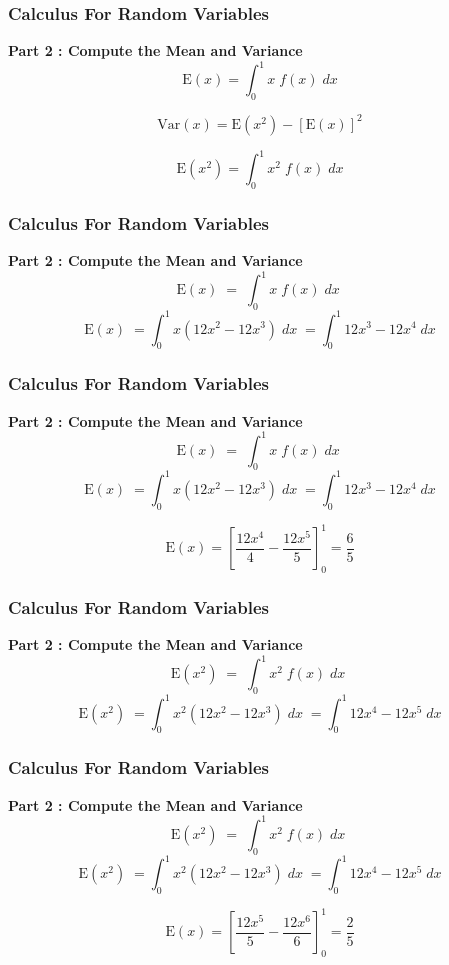 \documentclass[a4]{beamer}
\begin{document}
\begin{frame}
\frametitle{Calculus For Random Variables}
\Large
\vspace{-0.5cm}
\textbf{Part 2 :  Compute the Mean and Variance}\\
\[ \mathrm{E}(x) = \int^1_0 x\; f(x)\;dx  \]

\[ \mathrm{Var}(x) = \mathrm{E}(x^2)  - [\mathrm{E}(x)]^2   \]

\[ \mathrm{E}(x^2) = \int^1_0 x^2\; f(x)\;dx \]
\end{frame}
\begin{frame}
\frametitle{Calculus For Random Variables}
\Large
\vspace{-2.6cm}
\textbf{Part 2 :  Compute the Mean and Variance}\\
\[ \mathrm{E}(x) \; = \; \int^1_0 x\; f(x)\;dx \;   \]
\[ \mathrm{E}(x) \; = \int^1_0 x(12x^2-12x^3)\;dx  \; = \int^1_0 12x^3-12x^4\;dx  \]

\end{frame}
\begin{frame}
\frametitle{Calculus For Random Variables}
\Large
\vspace{-1.5cm}
\textbf{Part 2 :  Compute the Mean and Variance}\\
\[ \mathrm{E}(x) \; = \; \int^1_0 x\; f(x)\;dx \;   \]
\[ \mathrm{E}(x) \; = \int^1_0 x(12x^2-12x^3)\;dx  \; = \int^1_0 12x^3-12x^4\;dx  \]

\[ \mathrm{E}(x)  = \left[\frac{12x^4}{4}-\frac{12x^5}{5} \right]^1_0 = \frac{6}{5} \]
\end{frame}
\begin{frame}
\frametitle{Calculus For Random Variables}
\Large
\vspace{-2.6cm}
\textbf{Part 2 :  Compute the Mean and Variance}\\
\[ \mathrm{E}(x^2) \; = \; \int^1_0 x^2\; f(x)\;dx \;   \]
\[ \mathrm{E}(x^2) \; = \int^1_0 x^2(12x^2-12x^3)\;dx  \; = \int^1_0 12x^4-12x^5\;dx  \]

\end{frame}
\begin{frame}
\frametitle{Calculus For Random Variables}
\Large
\vspace{-1.5cm}
\textbf{Part 2 :  Compute the Mean and Variance}\\
\[ \mathrm{E}(x^2) \; = \; \int^1_0 x^2\; f(x)\;dx \;   \]
\[ \mathrm{E}(x^2) \; = \int^1_0 x^2(12x^2-12x^3)\;dx  \; = \int^1_0 12x^4-12x^5\;dx  \]

\[ \mathrm{E}(x)  = \left[\frac{12x^5}{5}-\frac{12x^6}{6} \right]^1_0 = \frac{2}{5} \]
\end{frame}
\end{document}

